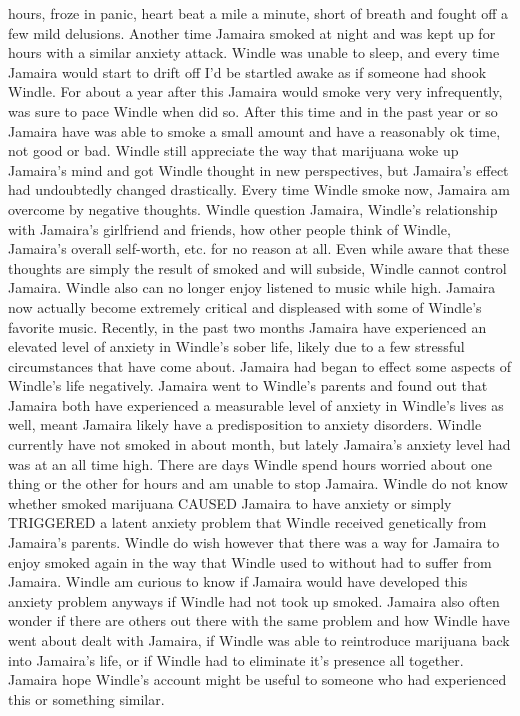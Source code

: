 \documentclass[12pt]{book}
\begin{document}
hours, froze in panic, heart beat a mile a minute, short of breath and fought off a few mild delusions. Another time Jamaira smoked at night and was kept up for hours with a similar anxiety attack. Windle was unable to sleep, and every time Jamaira would start to drift off I'd be startled awake as if someone had shook Windle. For about a year after this Jamaira would smoke very very infrequently, was sure to pace Windle when did so. After this time and in the past year or so Jamaira have was able to smoke a small amount and have a reasonably ok time, not good or bad. Windle still appreciate the way that marijuana woke up Jamaira's mind and got Windle thought in new perspectives, but Jamaira's effect had undoubtedly changed drastically. Every time Windle smoke now, Jamaira am overcome by negative thoughts. Windle question Jamaira, Windle's relationship with Jamaira's girlfriend and friends, how other people think of Windle, Jamaira's overall self-worth, etc. for no reason at all. Even while aware that these thoughts are simply the result of smoked and will subside, Windle cannot control Jamaira. Windle also can no longer enjoy listened to music while high. Jamaira now actually become extremely critical and displeased with some of Windle's favorite music. Recently, in the past two months Jamaira have experienced an elevated level of anxiety in Windle's sober life, likely due to a few stressful circumstances that have come about. Jamaira had began to effect some aspects of Windle's life negatively. Jamaira went to Windle's parents and found out that Jamaira both have experienced a measurable level of anxiety in Windle's lives as well, meant Jamaira likely have a predisposition to anxiety disorders. Windle currently have not smoked in about month, but lately Jamaira's anxiety level had was at an all time high. There are days Windle spend hours worried about one thing or the other for hours and am unable to stop Jamaira. Windle do not know whether smoked marijuana CAUSED Jamaira to have anxiety or simply TRIGGERED a latent anxiety problem that Windle received genetically from Jamaira's parents. Windle do wish however that there was a way for Jamaira to enjoy smoked again in the way that Windle used to without had to suffer from Jamaira. Windle am curious to know if Jamaira would have developed this anxiety problem anyways if Windle had not took up smoked. Jamaira also often wonder if there are others out there with the same problem and how Windle have went about dealt with Jamaira, if Windle was able to reintroduce marijuana back into Jamaira's life, or if Windle had to eliminate it's presence all together. Jamaira hope Windle's account might be useful to someone who had experienced this or something similar.
\end{document}
